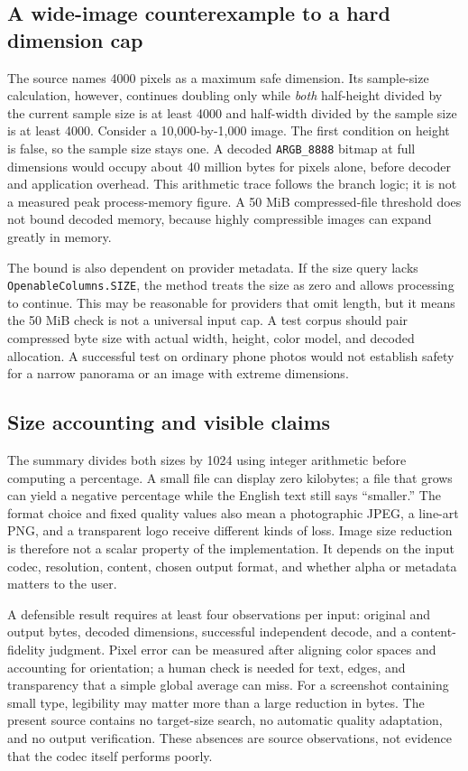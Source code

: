 \documentclass[10pt,letterpaper]{article}
\begin{document}
\subsection{A wide-image counterexample to a hard dimension cap}

The source names 4000 pixels as a maximum safe dimension. Its sample-size calculation, however, continues doubling only while \emph{both} half-height divided by the current sample size is at least 4000 and half-width divided by the sample size is at least 4000. Consider a 10,000-by-1,000 image. The first condition on height is false, so the sample size stays one. A decoded \texttt{ARGB\_8888} bitmap at full dimensions would occupy about 40 million bytes for pixels alone, before decoder and application overhead. This arithmetic trace follows the branch logic; it is not a measured peak process-memory figure. A 50 MiB compressed-file threshold does not bound decoded memory, because highly compressible images can expand greatly in memory.

The bound is also dependent on provider metadata. If the size query lacks \texttt{OpenableColumns.SIZE}, the method treats the size as zero and allows processing to continue. This may be reasonable for providers that omit length, but it means the 50 MiB check is not a universal input cap. A test corpus should pair compressed byte size with actual width, height, color model, and decoded allocation. A successful test on ordinary phone photos would not establish safety for a narrow panorama or an image with extreme dimensions.

\subsection{Size accounting and visible claims}

The summary divides both sizes by 1024 using integer arithmetic before computing a percentage. A small file can display zero kilobytes; a file that grows can yield a negative percentage while the English text still says ``smaller.'' The format choice and fixed quality values also mean a photographic JPEG, a line-art PNG, and a transparent logo receive different kinds of loss. Image size reduction is therefore not a scalar property of the implementation. It depends on the input codec, resolution, content, chosen output format, and whether alpha or metadata matters to the user.

A defensible result requires at least four observations per input: original and output bytes, decoded dimensions, successful independent decode, and a content-fidelity judgment. Pixel error can be measured after aligning color spaces and accounting for orientation; a human check is needed for text, edges, and transparency that a simple global average can miss. For a screenshot containing small type, legibility may matter more than a large reduction in bytes. The present source contains no target-size search, no automatic quality adaptation, and no output verification. These absences are source observations, not evidence that the codec itself performs poorly.
\end{document}

